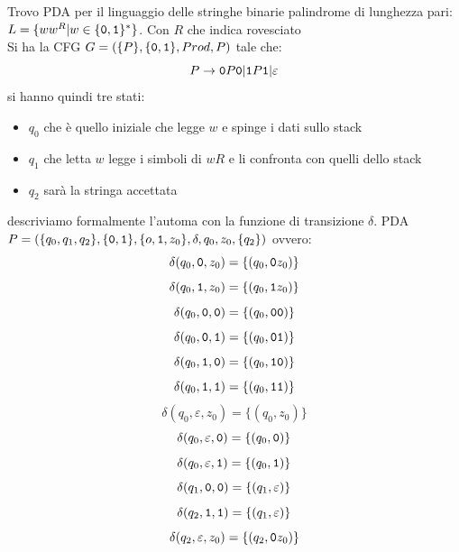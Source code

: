 \begin{example}
	Trovo PDA per il linguaggio delle stringhe binarie  palindrome di lunghezza pari: $L=\{ww^R|w\in\{\mathtt{0},\mathtt{1}\}^*\}$. Con $R$ che indica rovesciato\\
	Si ha la CFG $G=(\{P\},\{\mathtt{0},\mathtt{1}\},Prod,P)$ tale che:
	$$P\to \mathtt{0} P\mathtt{0}|\mathtt{1} P\mathtt{1}|\varepsilon$$
	si hanno quindi tre stati:
	\begin{itemize}
		\item $q_0$ che è quello iniziale che legge $w$ e spinge i dati sullo stack
		\item $q_1$ che letta $w$ legge i simboli di $wR$ e li confronta con quelli dello stack
		\item $q_2$ sarà la stringa accettata
	\end{itemize}
	descriviamo formalmente l'automa con la funzione di transizione $\delta$.
	PDA $P=(\{q_0,q_1,q_2\},\{\mathtt{0},\mathtt{1}\}, \{o,\mathtt{1},z_0\},\delta,q_0,z_0,\{q_2\})$
	ovvero:
	$$\delta(q_0,\mathtt{0},z_0)=\{(q_0,\mathtt{0} z_0)\}$$
	$$\delta(q_0,\mathtt{1},z_0)=\{(q_0,\mathtt{1} z_0)\}$$
	$$\delta(q_0,\mathtt{0},\mathtt{0})=\{(q_0,\mathtt{0}\mathtt{0})\}$$
	$$\delta(q_0,\mathtt{0},\mathtt{1})=\{(q_0,\mathtt{0}\mathtt{1})\}$$
	$$\delta(q_0,\mathtt{1},\mathtt{0})=\{(q_0,\mathtt{1}\mathtt{0})\}$$
	$$\delta(q_0,\mathtt{1},\mathtt{1})=\{(q_0,\mathtt{1}\mathtt{1})\}$$
	$$\delta(q_0,\varepsilon,z_0)=\{(q_0,z_0)\}$$
	$$\delta(q_0,\varepsilon,\mathtt{0})=\{(q_0,\mathtt{0})\}$$
	$$\delta(q_0,\varepsilon,\mathtt{1})=\{(q_0,\mathtt{1})\}$$
	$$\delta(q_1,\mathtt{0},\mathtt{0})=\{(q_1,\varepsilon)\}$$
	$$\delta(q_2,\mathtt{1},\mathtt{1})=\{(q_1,\varepsilon)\}$$
	$$\delta(q_2,\varepsilon,z_0)=\{(q_2,\mathtt{0} z_0)\}$$


\end{example}
